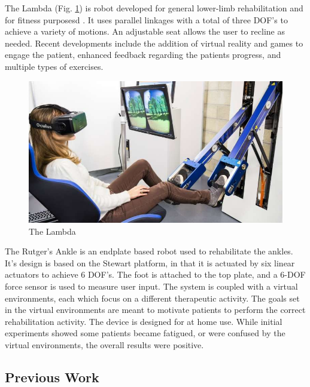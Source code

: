 \documentclass[12pt]{report}
\begin{document}
	The Lambda (Fig. \ref{fig:Lambda}) is robot developed for general lower-limb rehabilitation and for fitness purposesd \cite{Bouri2009}. It uses parallel linkages with a total of three DOF's to achieve a variety of motions. An adjustable seat allows the user to recline as needed. Recent developments include the addition of virtual reality and games to engage the patient, enhanced feedback regarding the patients progress, and multiple types of exercises. 
	
	\begin{figure}[t] 
		\centering
		\includegraphics[width=0.75\linewidth]{Lambda}
		\caption{The Lambda}
		\label{fig:Lambda}
	\end{figure}
	
	The Rutger's Ankle \cite{Burdea2000} is an endplate based robot used to rehabilitate the ankles. It's design is based on the Stewart platform, in that it is actuated by six linear actuators to achieve 6 DOF's. The foot is attached to the top plate, and a 6-DOF force sensor is used to measure user input. The system is coupled with a virtual environments, each which focus on a different therapeutic activity. The goals set in the virtual environments are meant to motivate patients to perform the correct rehabilitation activity. The device is designed for at home use. While initial experiments showed some patients became fatigued, or were confused by the virtual environments, the overall results were positive. 

\subsection{Previous Work} 	
\end{document}
